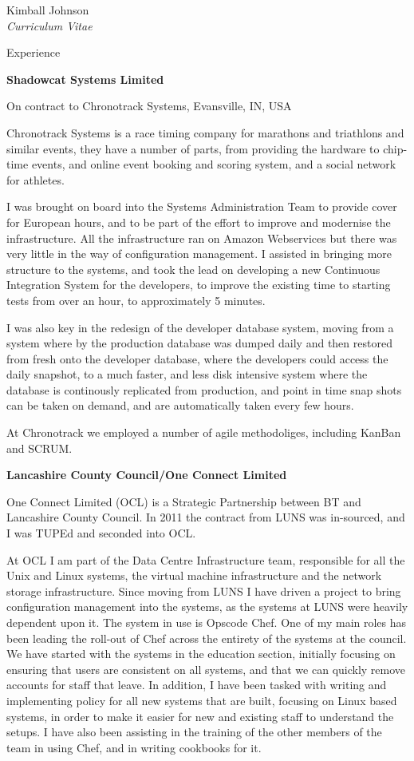 \documentclass[10pt]{article}
\begin{document}
\begin{cv}{Kimball Johnson\\{\large \itshape Curriculum Vitae}}
\begin{cvlist}{Experience}
    \item \textbf{Shadowcat Systems Limited}
    
    
    On contract to Chronotrack Systems, Evansville, IN, USA

    Chronotrack Systems is a race timing company for marathons and triathlons
    and similar events, they have a number of parts, from providing the
    hardware to chip-time events, and online event booking and scoring system,
    and a social network for athletes.

    I was brought on board into the Systems Administration Team to provide
    cover for European hours, and to be part of the effort to improve and
    modernise the infrastructure.  All the infrastructure ran on Amazon
    Webservices but there was very little in the way of configuration
    management.  I assisted in bringing more structure to the systems, and
    took the lead on developing a new Continuous Integration System for the
    developers, to improve the existing time to starting tests from over an
    hour, to approximately 5 minutes.  

    I was also key in the redesign of the developer database system, moving
    from a system where by the production database was dumped daily and then
    restored from fresh onto the developer database, where the developers
    could access the daily snapshot, to a much faster, and less disk intensive
    system where the database is continously replicated from production, and point
    in time snap shots can be taken on demand, and are automatically taken every
    few hours.

    At Chronotrack we employed a number of agile methodoliges, including
    KanBan and SCRUM. 
    \item \textbf{Lancashire County Council/One Connect Limited}

    One Connect Limited (OCL) is a Strategic Partnership between BT and Lancashire
    County Council. In 2011 the contract from LUNS was in-sourced, and I was TUPEd 
    and seconded into OCL.

    At OCL I am part of the Data Centre Infrastructure team, responsible for
    all the Unix and Linux systems, the virtual machine infrastructure and the
    network storage infrastructure.  Since moving from LUNS I have driven a
    project to bring configuration management into the systems, as the systems
    at LUNS were heavily dependent upon it.  The system in use is Opscode
    Chef. One of my main roles has been leading the roll-out of Chef across the
entirety  of the systems at the council.  We have started with the systems in
the education section, initially focusing on ensuring that users are
consistent on all systems, and that we can quickly remove accounts for staff
that leave. In addition, I have been tasked with writing and implementing policy for
all new systems that are built, focusing on Linux based systems, in order to
make it easier for new and existing staff to understand the setups.   I have
also been assisting in the training of the other members of the team in using
Chef, and in writing cookbooks for it.


\end{cvlist}
\end{cv}
\end{document}
